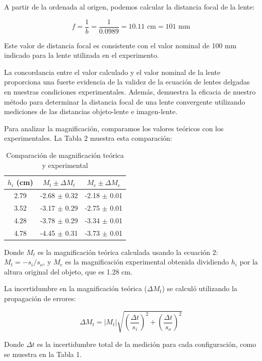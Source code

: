 \documentclass[twocolumn,a4paper,11pt]{scrartcl}
\begin{document}
A partir de la ordenada al origen, podemos calcular la distancia focal de la lente:

\begin{equation}
f = \frac{1}{b} = \frac{1}{0.0989} = 10.11 \text{ cm} = 101 \text{ mm}
\end{equation}

Este valor de distancia focal es consistente con el valor nominal de 100 mm indicado para la lente utilizada en el experimento.

La concordancia entre el valor calculado y el valor nominal de la lente proporciona una fuerte evidencia de la validez de la ecuación de lentes delgadas en nuestras condiciones experimentales. Además, demuestra la eficacia de nuestro método para determinar la distancia focal de una lente convergente utilizando mediciones de las distancias objeto-lente e imagen-lente.

Para analizar la magnificación, comparamos los valores teóricos con los experimentales. La Tabla 2 muestra esta comparación:

\begin{table}[h]
\centering
\caption{Comparación de magnificación teórica y experimental}
\label{tab:magnificacion}
\begin{tabular}{|c|c|c|}
\hline
$h_i$ (cm) & $M_t \pm \Delta M_t$ & $M_e \pm \Delta M_e$ \\
\hline
2.79 & -2.68 $\pm$ 0.32 & -2.18 $\pm$ 0.01 \\
3.52 & -3.17 $\pm$ 0.29 & -2.75 $\pm$ 0.01 \\
4.28 & -3.78 $\pm$ 0.29 & -3.34 $\pm$ 0.01 \\
4.78 & -4.45 $\pm$ 0.31 & -3.73 $\pm$ 0.01 \\
\hline
\end{tabular}
\end{table}

Donde $M_t$ es la magnificación teórica calculada usando la ecuación 2: $M_t = -s_i/s_o$, y $M_e$ es la magnificación experimental obtenida dividiendo $h_i$ por la altura original del objeto, que es 1.28 cm.

La incertidumbre en la magnificación teórica ($\Delta M_t$) se calculó utilizando la propagación de errores:

\begin{equation}
\Delta M_t = |M_t| \sqrt{(\frac{\Delta t}{s_i})^2 + (\frac{\Delta t}{s_o})^2}
\end{equation}

Donde $\Delta t$ es la incertidumbre total de la medición para cada configuración, como se muestra en la Tabla 1.
\end{document}
